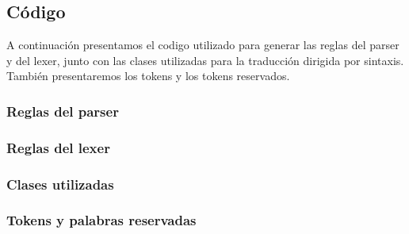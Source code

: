 \subsection{Código}
A continuación presentamos el codigo utilizado para generar las reglas del
parser y del lexer, junto con las clases utilizadas para
la traducción dirigida por sintaxis. También presentaremos los tokens y los
tokens reservados.
\subsubsection{Reglas del parser}


\subsubsection{Reglas del lexer}


\subsubsection{Clases utilizadas}


\subsubsection{Tokens y palabras reservadas}


